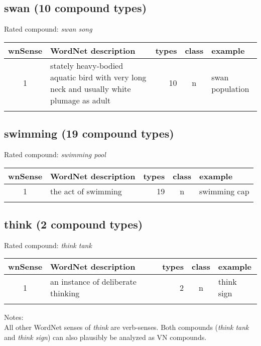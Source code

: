 \subsection{swan         (10 compound types)}
Rated compound: \emph{swan song}

\vspace*{1ex}

\noindent
\begin{longtable}{c>{\raggedright\arraybackslash}p{5cm}rc>{\raggedright\arraybackslash}p{2cm}}\lsptoprule
{\small wnSense}&WordNet description&types&class&example\\\midrule
1&stately heavy-bodied aquatic bird with very long neck and usually white plumage as adult&10&n&swan population\\\lspbottomrule
\end{longtable}

\subsection{swimming     (19 compound types)}
Rated compound: \emph{swimming pool}


\vspace*{1ex}

\noindent
\begin{longtable}{c>{\raggedright\arraybackslash}p{5cm}rc>{\raggedright\arraybackslash}p{2cm}}\lsptoprule
{\small wnSense}&WordNet description&types&class&example\\\midrule
1&the act of swimming&19&n&swimming cap\\\lspbottomrule
\end{longtable}
\subsection{think        (2 compound types)}
Rated compound: \emph{think tank}

\vspace*{1ex}

\noindent
\begin{longtable}{c>{\raggedright\arraybackslash}p{5cm}rc>{\raggedright\arraybackslash}p{2cm}}\lsptoprule
{\small wnSense}&WordNet description&types&class&example\\\midrule
1&an instance of deliberate thinking&2&n&think sign\\\lspbottomrule
\end{longtable}

\noindent
Notes:\\
All other WordNet senses of \emph{think} are verb-senses. Both
compounds (\emph{think tank} and \emph{think sign}) can also plausibly
be analyzed as VN compounds. 

